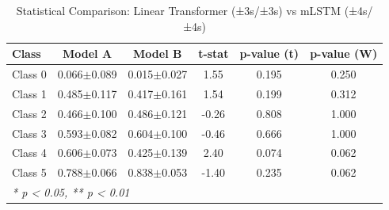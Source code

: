 \begin{table}[htbp]
\centering
\caption{Statistical Comparison: Linear Transformer (±3s/±3s) vs mLSTM (±4s/±4s)}
\label{tab:comparison_class_linear_transformer_±3s_±3s_vs_mlstm_±4s_±4s}
\begin{tabular}{lccccc}
\toprule
\textbf{Class} & \textbf{Model A} & \textbf{Model B} & \textbf{t-stat} & \textbf{p-value (t)} & \textbf{p-value (W)} \\
\midrule
Class 0 & 0.066$\pm$0.089 & 0.015$\pm$0.027 & 1.55 & 0.195 & 0.250 \\
Class 1 & 0.485$\pm$0.117 & 0.417$\pm$0.161 & 1.54 & 0.199 & 0.312 \\
Class 2 & 0.466$\pm$0.100 & 0.486$\pm$0.121 & -0.26 & 0.808 & 1.000 \\
Class 3 & 0.593$\pm$0.082 & 0.604$\pm$0.100 & -0.46 & 0.666 & 1.000 \\
Class 4 & 0.606$\pm$0.073 & 0.425$\pm$0.139 & 2.40 & 0.074 & 0.062 \\
Class 5 & 0.788$\pm$0.066 & 0.838$\pm$0.053 & -1.40 & 0.235 & 0.062 \\
\bottomrule
\multicolumn{6}{l}{\textit{* p < 0.05, ** p < 0.01}} \\
\end{tabular}
\end{table}